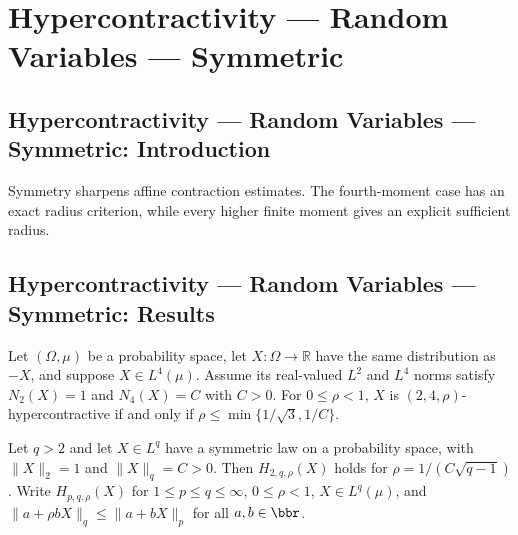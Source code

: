 \section{Hypercontractivity --- Random Variables --- Symmetric}
\subsection*{Hypercontractivity --- Random Variables --- Symmetric: Introduction}
Symmetry sharpens affine contraction estimates. The fourth-moment case has an exact radius criterion, while every higher finite moment gives an explicit sufficient radius.

\subsection*{Hypercontractivity --- Random Variables --- Symmetric: Results}

\begin{theorem}
\leanok
{}
Let $(\Omega,\mu)$ be a probability space, let $X:\Omega\to\mathbb R$ have the same
distribution as $-X$, and suppose $X\in L^4(\mu)$. Assume its real-valued $L^2$ and
$L^4$ norms satisfy $N_2(X)=1$ and $N_4(X)=C$ with $C>0$. For $0\le\rho<1$, $X$ is
$(2,4,\rho)$-hypercontractive if and only if $\rho\le\min\{1/\sqrt3,1/C\}$.
\end{theorem}

\begin{theorem}
\leanok
{}
Let $q>2$ and let $X\in L^q$ have a symmetric law on a probability space, with $\|X\|_2=1$ and $\|X\|_q=C>0$. Then $H_{2,q,\rho}(X)$ holds for $\rho=1/(C\sqrt{q-1})$. Write $H_{p,q,\rho}(X)$ for $1\le p\le q\le\infty$, $0\le\rho<1$, $X\in L^q(\mu)$, and $\|a+\rho bX\|_q\le\|a+bX\|_p$ for all $a,b\in\bbr$.
\end{theorem}
